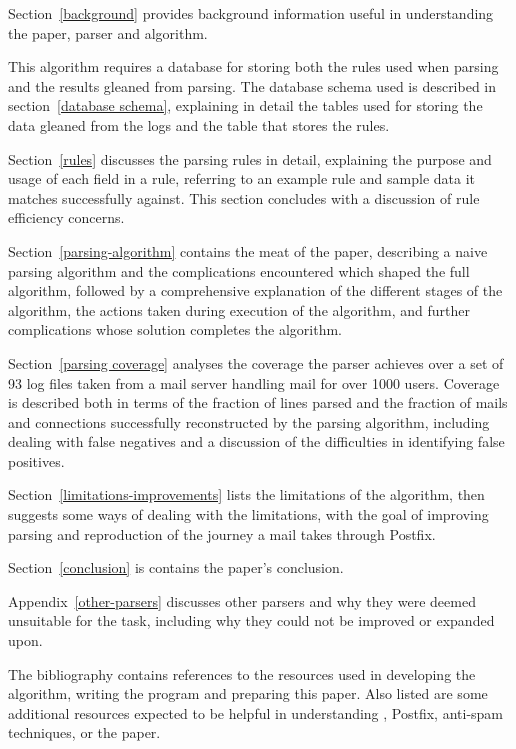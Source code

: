 \documentclass[a4paper,12pt,draft]{article}
\newcommand{\numberOFlogFILES}[0]{%
    93%
}
\begin{document}
Section~\ref{background} provides background information useful in
understanding the paper, parser and algorithm.

This algorithm requires a database for storing both the rules used when
parsing and the results gleaned from parsing.  The database schema used is
described in section~\ref{database schema}, explaining in detail the tables
used for storing the data gleaned from the logs and the table that stores
the rules.

Section~\ref{rules} discusses the parsing rules in detail, explaining the
purpose and usage of each field in a rule, referring to an example rule and
sample data it matches successfully against.  This section concludes with a
discussion of rule efficiency concerns.

Section~\ref{parsing-algorithm} contains the meat of the paper, describing
a naive parsing algorithm and the complications encountered which shaped
the full algorithm, followed by a comprehensive explanation of the
different stages of the algorithm, the actions taken during execution of
the algorithm, and further complications whose solution completes the
algorithm.

Section~\ref{parsing coverage} analyses the coverage the parser achieves
over a set of \numberOFlogFILES{} log files taken from a mail server
handling mail for over 1000 users.  Coverage is described both in terms of
the fraction of lines parsed and the fraction of mails and connections
successfully reconstructed by the parsing algorithm, including dealing with
false negatives and a discussion of the difficulties in identifying false
positives.

Section~\ref{limitations-improvements} lists the limitations of the
algorithm, then suggests some ways of dealing with the limitations, with
the goal of improving parsing and reproduction of the journey a mail takes
through Postfix.

Section~\ref{conclusion} is contains the paper's conclusion.

Appendix~\ref{other-parsers} discusses other parsers and why they were
deemed unsuitable for the task, including why they could not be improved or
expanded upon.

The bibliography contains references to the resources used in developing
the algorithm, writing the program and preparing this paper.  Also listed
are some additional resources expected to be helpful in understanding
\SMTP{}, Postfix, anti-spam techniques, or the paper.
\end{document}
